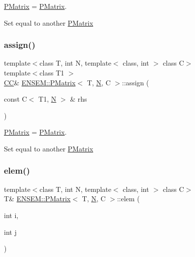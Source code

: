 \mbox{\hyperlink{classENSEM_1_1PMatrix}{P\+Matrix}} = \mbox{\hyperlink{classENSEM_1_1PMatrix}{P\+Matrix}}. 

Set equal to another \mbox{\hyperlink{classENSEM_1_1PMatrix}{P\+Matrix}} \mbox{\label{classENSEM_1_1PMatrix_ac3c0e489c8c8011edc4ea93477176b84}} 
\subsubsection{\texorpdfstring{assign()}{assign()}\hspace{0.1cm}{\footnotesize\ttfamily [9/9]}}
{\footnotesize\ttfamily template$<$class T, int N, template$<$ class, int $>$ class C$>$ \\
template$<$class T1 $>$ \\
\mbox{\hyperlink{classENSEM_1_1PMatrix_a744bac549029029effe32dc1705660ec}{CC}}\& \mbox{\hyperlink{classENSEM_1_1PMatrix}{E\+N\+S\+E\+M\+::\+P\+Matrix}}$<$ T, \mbox{\hyperlink{adat__devel_2lib_2hadron_2operator__name__util_8cc_a7722c8ecbb62d99aee7ce68b1752f337}{N}}, C $>$\+::assign (\begin{DoxyParamCaption}\item[{const C$<$ T1, \mbox{\hyperlink{adat__devel_2lib_2hadron_2operator__name__util_8cc_a7722c8ecbb62d99aee7ce68b1752f337}{N}} $>$ \&}]{rhs }\end{DoxyParamCaption})\hspace{0.3cm}{\ttfamily [inline]}}



\mbox{\hyperlink{classENSEM_1_1PMatrix}{P\+Matrix}} = \mbox{\hyperlink{classENSEM_1_1PMatrix}{P\+Matrix}}. 

Set equal to another \mbox{\hyperlink{classENSEM_1_1PMatrix}{P\+Matrix}} \mbox{\label{classENSEM_1_1PMatrix_a358c5f1cd954ddda32677d9ad8765ef2}} 
\subsubsection{\texorpdfstring{elem()}{elem()}\hspace{0.1cm}{\footnotesize\ttfamily [1/6]}}
{\footnotesize\ttfamily template$<$class T, int N, template$<$ class, int $>$ class C$>$ \\
T\& \mbox{\hyperlink{classENSEM_1_1PMatrix}{E\+N\+S\+E\+M\+::\+P\+Matrix}}$<$ T, \mbox{\hyperlink{adat__devel_2lib_2hadron_2operator__name__util_8cc_a7722c8ecbb62d99aee7ce68b1752f337}{N}}, C $>$\+::elem (\begin{DoxyParamCaption}\item[{int}]{i,  }\item[{int}]{j }\end{DoxyParamCaption})\hspace{0.3cm}{\ttfamily [inline]}}

